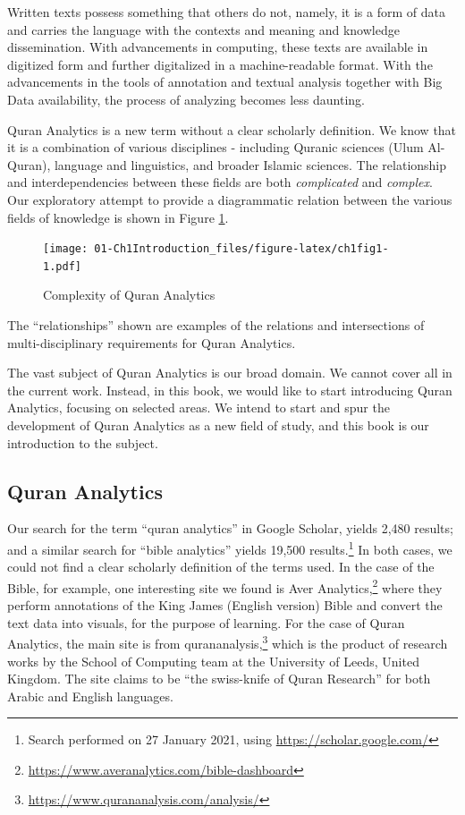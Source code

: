 \documentclass[
]{article}
\begin{document}
Written texts possess something that others do not, namely, it is a form of data and carries the language with the contexts and meaning and knowledge dissemination. With advancements in computing, these texts are available in digitized form and further digitalized in a machine-readable format. With the advancements in the tools of annotation and textual analysis together with Big Data availability, the process of analyzing becomes less daunting.

Quran Analytics is a new term without a clear scholarly definition. We know that it is a combination of various disciplines - including Quranic sciences (Ulum Al-Quran), language and linguistics, and broader Islamic sciences. The relationship and interdependencies between these fields are both \emph{complicated} and \emph{complex}. Our exploratory attempt to provide a diagrammatic relation between the various fields of knowledge is shown in Figure \ref{fig:ch1fig1}.

\begin{figure}
\centering
\texttt{[image: 01-Ch1Introduction\_files/figure-latex/ch1fig1-1.pdf]}
\caption{\label{fig:ch1fig1}Complexity of Quran Analytics}
\end{figure}

The ``relationships'' shown are examples of the relations and intersections of multi-disciplinary requirements for Quran Analytics.

The vast subject of Quran Analytics is our broad domain. We cannot cover all in the current work. Instead, in this book, we would like to start introducing Quran Analytics, focusing on selected areas. We intend to start and spur the development of Quran Analytics as a new field of study, and this book is our introduction to the subject.

\hypertarget{quran-analytics}{%
\subsection{Quran Analytics}\label{quran-analytics}}

Our search for the term ``quran analytics'' in Google Scholar, yields 2,480 results; and a similar search for ``bible analytics'' yields 19,500 results.\footnote{Search performed on 27 January 2021, using \url{https://scholar.google.com/}} In both cases, we could not find a clear scholarly definition of the terms used. In the case of the Bible, for example, one interesting site we found is Aver Analytics,\footnote{\url{https://www.averanalytics.com/bible-dashboard}} where they perform annotations of the King James (English version) Bible and convert the text data into visuals, for the purpose of learning. For the case of Quran Analytics, the main site is from qurananalysis,\footnote{\url{https://www.qurananalysis.com/analysis/}} which is the product of research works by the School of Computing team at the University of Leeds, United Kingdom. The site claims to be ``the swiss-knife of Quran Research'' for both Arabic and English languages.
\end{document}
